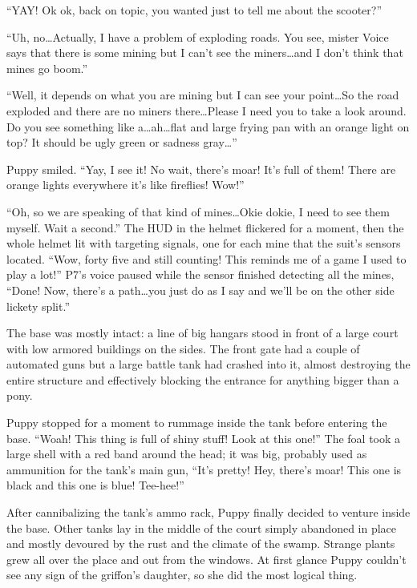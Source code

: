 ``YAY! Ok ok, back on topic, you wanted just to tell me about the scooter?''

``Uh, no\dots Actually, I have a problem of exploding roads. You see, mister Voice says that there is some mining but I can't see the miners\dots and I don't think that mines go boom.''

``Well, it depends on what you are mining but I can see your point\dots So the road exploded and there are no miners there\dots Please I need you to take a look around. Do you see something like a\dots ah\dots flat and large frying pan with an orange light on top? It should be ugly green or sadness gray\dots''

Puppy smiled. ``Yay, I see it! No wait, there's moar! It's full of them! There are orange lights everywhere it's like fireflies! Wow!''

``Oh, so we are speaking of that kind of mines\dots Okie dokie, I need to see them myself. Wait a second.'' The HUD in the helmet flickered for a moment, then the whole helmet lit with targeting signals, one for each mine that the suit's sensors located. ``Wow, forty five and still counting! This reminds me of a game I used to play a lot!'' P7's voice paused while the sensor finished detecting all the mines, ``Done! Now, there's a path\dots you just do as I say and we'll be on the other side lickety split.''

\horizonline


The base was mostly intact: a line of big hangars stood in front of a large court with low armored buildings on the sides. The front gate had a couple of automated guns but a large battle tank had crashed into it, almost destroying the entire structure and effectively blocking the entrance for anything bigger than a pony.

Puppy stopped for a moment to rummage inside the tank before entering the base. ``Woah! This thing is full of shiny stuff! Look at this one!'' The foal took a large shell with a red band around the head; it was big, probably used as ammunition for the tank's main gun, ``It's pretty! Hey, there's moar! This one is black and this one is blue! Tee-hee!''

After cannibalizing the tank's ammo rack, Puppy finally decided to venture inside the base. Other tanks lay in the middle of the court simply abandoned in place and mostly devoured by the rust and the climate of the swamp. Strange plants grew all over the place and out from the windows. At first glance Puppy couldn't see any sign of the griffon's daughter, so she did the most logical thing.

